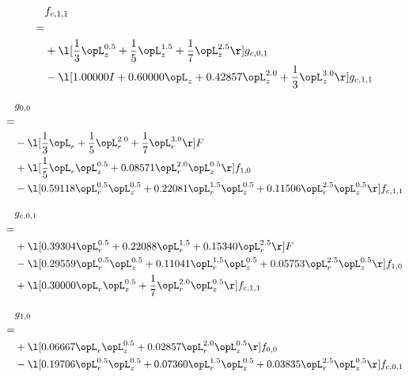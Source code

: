 \begin{alignat}{2} 
\label{eq:f_11_0} 
& f_{c,1,1} \nonumber \\ 
 = \\ 
& + \l[ \frac{1}{3} \opL_z^{0.5} + \frac{1}{5} \opL_z^{1.5} + \frac{1}{7} \opL_z^{2.5}  \r] g_{c,0,1} \nonumber \\ 
& - \l[  1.00000 I +  0.60000 \opL_z +  0.42857 \opL_z^{2.0} + \frac{1}{3} \opL_z^{3.0}  \r] g_{c,1,1} \nonumber \\ 
\end{alignat} 


\begin{alignat}{2} 
\label{eq:g_00_0} 
& g_{0,0} \nonumber \\ 
 = \\ 
& - \l[ \frac{1}{3} \opL_r + \frac{1}{5} \opL_r^{2.0} + \frac{1}{7} \opL_r^{3.0}  \r] F \nonumber \\ 
& + \l[ \frac{1}{5} \opL_r \opL_z^{0.5} +  0.08571 \opL_r^{2.0} \opL_z^{0.5}  \r] f_{1,0} \nonumber \\ 
& - \l[  0.59118 \opL_r^{0.5} \opL_z^{0.5} +  0.22081 \opL_r^{1.5} \opL_z^{0.5} +  0.11506 \opL_r^{2.5} \opL_z^{0.5}  \r] f_{c,1,1} \nonumber \\ 
\end{alignat} 


\begin{alignat}{2} 
\label{eq:g_01_0} 
& g_{c,0,1} \nonumber \\ 
 = \\ 
& + \l[  0.39304 \opL_r^{0.5} +  0.22088 \opL_r^{1.5} +  0.15340 \opL_r^{2.5}  \r] F \nonumber \\ 
& - \l[  0.29559 \opL_r^{0.5} \opL_z^{0.5} +  0.11041 \opL_r^{1.5} \opL_z^{0.5} +  0.05753 \opL_r^{2.5} \opL_z^{0.5}  \r] f_{1,0} \nonumber \\ 
& + \l[  0.30000 \opL_r \opL_z^{0.5} + \frac{1}{7} \opL_r^{2.0} \opL_z^{0.5}  \r] f_{c,1,1} \nonumber \\ 
\end{alignat} 


\begin{alignat}{2} 
\label{eq:g_10_0} 
& g_{1,0} \nonumber \\ 
 = \\ 
& + \l[  0.06667 \opL_r \opL_z^{0.5} +  0.02857 \opL_r^{2.0} \opL_z^{0.5}  \r] f_{0,0} \nonumber \\ 
& - \l[  0.19706 \opL_r^{0.5} \opL_z^{0.5} +  0.07360 \opL_r^{1.5} \opL_z^{0.5} +  0.03835 \opL_r^{2.5} \opL_z^{0.5}  \r] f_{c,0,1} \nonumber \\ 
\end{alignat} 


